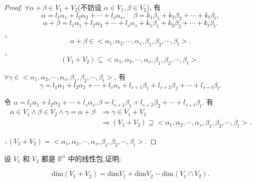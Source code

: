 \documentclass{ctexart}
\begin{document}
\begin{proof}
    $\forall\alpha+\beta\in V_1+V_2$(不妨设 $\alpha\in V_1,\beta\in V_2$), 有
    \[\alpha=l_1\alpha_1+l_2\alpha_2+\cdots+l_s\alpha_s,\quad\beta=k_1\beta_1+k_2\beta_2+\cdots+k_t\beta_t,\]
    \[\alpha+\beta=l_1\alpha_1+l_2\alpha_2+\cdots+l_s\alpha_s+k_1\beta_1+k_2\beta_2+\cdots+k_t\beta_t.\]

    $\therefore$
    \[\alpha+\beta\in<\alpha_1,\alpha_2,\cdots,\alpha_s,\beta_1,\beta_2,\cdots,\beta_t>.\]
    
    $\therefore$
    \[(V_1+V_2)\subseteq<\alpha_1,\alpha_2,\cdots,\alpha_s,\beta_1,\beta_2,\cdots,\beta_t>.\]

    $\forall\gamma\in<\alpha_1,\alpha_2,\cdots,\alpha_s,\beta_1,\beta_2,\cdots,\beta_t>$, 有
    \[\gamma=l_1\alpha_1+l_2\alpha_2+\cdots+l_s\alpha_s+l_{s+1}\beta_1+l_{s+2}\beta_2+\cdots+l_{s+t}\beta_t.\]

    令 $\alpha=l_1\alpha_1+l_2\alpha_2+\cdots+l_s\alpha_s,\beta=l_{s+1}\beta_1+l_{s+2}\beta_2+\cdots+l_{s+t}\beta_t$, 有
    \begin{align*}
        \alpha\in V_1\land\beta\in V_2\land\gamma=\alpha+\beta & \Rightarrow\gamma\in V_1+V_2 \\
        & \Rightarrow(V_1+V_2)\supseteq<\alpha_1,\alpha_2,\cdots,\alpha_s,\beta_1,\beta_2,\cdots,\beta_t>.
    \end{align*}

    $\therefore(V_1+V_2)=<\alpha_1,\alpha_2,\cdots,\alpha_s,\beta_1,\beta_2,\cdots,\beta_t>.$
\end{proof}
\begin{exercise}[有改动]\label{ex1.7}
设 $V_1$ 和 $V_2$ 都是 $\mathbb{R}^n$ 中的线性包,证明:

$$\mathrm{dim}(V_1+V_2)=\mathrm{dim}V_1+\mathrm{dim}V_2-\mathrm{dim}(V_1\cap V_2).$$
\end{exercise}
\end{document}
